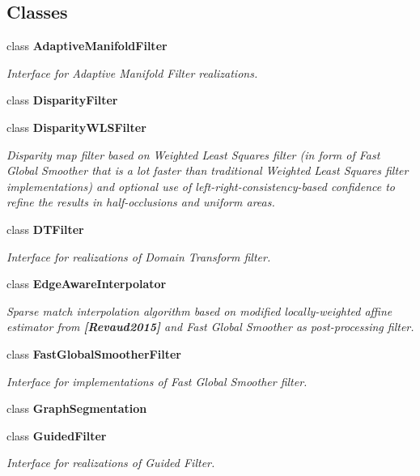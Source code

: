 \subsection*{Classes}
\begin{DoxyCompactItemize}
\item 
class {\bfseries Adaptive\+Manifold\+Filter}
\begin{DoxyCompactList}\small\item\em Interface for Adaptive Manifold Filter realizations. \end{DoxyCompactList}\item 
class {\bfseries Disparity\+Filter}
\item 
class {\bfseries Disparity\+W\+L\+S\+Filter}
\begin{DoxyCompactList}\small\item\em Disparity map filter based on Weighted Least Squares filter (in form of Fast Global Smoother that is a lot faster than traditional Weighted Least Squares filter implementations) and optional use of left-\/right-\/consistency-\/based confidence to refine the results in half-\/occlusions and uniform areas. \end{DoxyCompactList}\item 
class {\bfseries D\+T\+Filter}
\begin{DoxyCompactList}\small\item\em Interface for realizations of Domain Transform filter. \end{DoxyCompactList}\item 
class {\bfseries Edge\+Aware\+Interpolator}
\begin{DoxyCompactList}\small\item\em Sparse match interpolation algorithm based on modified locally-\/weighted affine estimator from {\bfseries [Revaud2015]} and Fast Global Smoother as post-\/processing filter. \end{DoxyCompactList}\item 
class {\bfseries Fast\+Global\+Smoother\+Filter}
\begin{DoxyCompactList}\small\item\em Interface for implementations of Fast Global Smoother filter. \end{DoxyCompactList}\item 
class {\bfseries Graph\+Segmentation}
\item 
class {\bfseries Guided\+Filter}
\begin{DoxyCompactList}\small\item\em Interface for realizations of Guided Filter. \end{DoxyCompactList}\item 

\end{DoxyCompactItemize}
